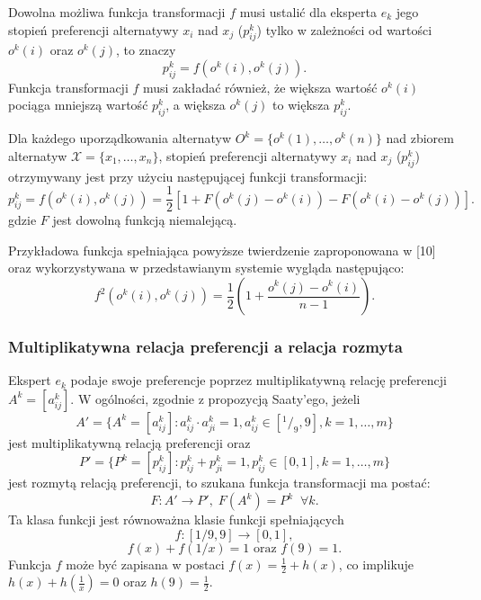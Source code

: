 Dowolna możliwa funkcja transformacji $f$ musi ustalić dla eksperta $e_k$ jego
stopień preferencji alternatywy $x_i$ nad $x_j$ ($p^k_{ij}$) tylko w zależności
od wartości $o^k(i)$ oraz $o^k(j)$, to znaczy
\begin{equation}
p^k_{ij} = f(o^k(i), o^k(j)).
\end{equation}
Funkcja transformacji $f$ musi zakładać również, że większa wartość $o^k(i)$
pociąga mniejszą wartość $p^k_{ij}$, a większa $o^k(j)$ to większa $p^k_{ij}$.

\begin{theorem}
Dla każdego uporządkowania alternatyw $O^k = \{o^k(1), \dotsc, o^k(n)\}$ nad
zbiorem alternatyw $\mathcal{X} = \{x_1,\dotsc,x_n\}$, stopień preferencji
alternatywy $x_i$ nad $x_j$ ($p^k_{ij}$) otrzymywany jest przy użyciu
następującej funkcji transformacji:
\begin{equation}
p^k_{ij} = f(o^k(i),o^k(j)) = \frac{1}{2} [1 + F(o^k(j) - o^k(i)) - F(o^k(i) -
o^k(j))].
\end{equation}
gdzie $F$ jest dowolną funkcją niemalejącą.
\end{theorem}

Przykładowa funkcja spełniająca powyższe twierdzenie zaproponowana w [10] oraz
wykorzystywana w przedstawianym systemie wygląda następująco:
\begin{equation}
f^2(o^k(i),o^k(j)) = \frac{1}{2}(1 + \frac{o^k(j) - o^k(i) }{n-1}).
\end{equation}

\subsubsection{Multiplikatywna relacja preferencji a relacja rozmyta}
Ekspert $e_k$ podaje swoje preferencje poprzez multiplikatywną relację
preferencji $A^k = [a^k_{ij}]$. W ogólności, zgodnie z propozycją Saaty'ego,
jeżeli
$$A' = \{ A^k = [a^k_{ij}] : a^k_{ij} \cdot a^k_{ji} = 1, a^k_{ij} \in
[^1/_9,9], k= 1, \dotsc, m \}$$ 
jest multiplikatywną relacją preferencji oraz
$$P' = \{ P^k = [p^k_{ij}] : p^k_{ij} + p^k_{ji} = 1, p^k_{ij} \in
[0,1], k= 1, \dotsc, m \}$$
jest rozmytą relacją preferencji, to szukana funkcja transformacji ma postać:
$$F : A' \rightarrow P',\; F(A^k) = P^k \;\; \forall k.$$ 
Ta klasa funkcji jest równoważna klasie funkcji spełniających
$$f : [1/9, 9] \rightarrow [0,1],$$
$$ f(x)+f(1/x)=1 \text{ oraz } f(9)=1.$$
Funkcja $f$ może być zapisana w postaci $f(x) = \frac{1}{2} + h(x)$, co
implikuje $h(x) + h(\frac{1}{x}) = 0 $ oraz $h(9) = \frac{1}{2}.$

